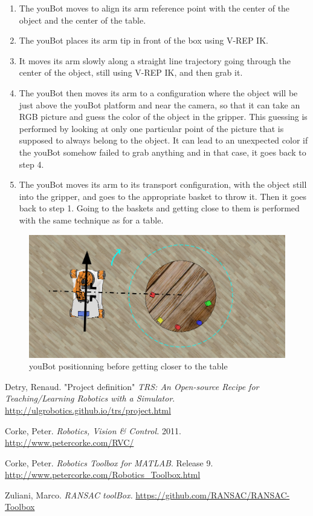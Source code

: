 \documentclass[12pt,a4paper]{article}
\begin{document}
\begin{enumerate}
\item The youBot moves to align its arm reference point with the center of the object and the center of the table.
\item The youBot places its arm tip in front of the box using V-REP IK.
\item It moves its arm slowly along a straight line trajectory going through the center of the object, still using V-REP IK, and then grab it.
\item The youBot then moves its arm to a configuration where the object will be just above the youBot platform and near the camera, so that it can take an RGB picture and guess the color of the object in the gripper. This guessing is performed by looking at only one particular point of the picture that is supposed to always belong to the object. It can lead to an unexpected color if the youBot somehow failed to grab anything and in that case, it goes back to step 4.   
\item The youBot moves its arm to its transport configuration, with the object still into the gripper, and goes to the appropriate basket to throw it. Then it goes back to step 1. Going to the baskets and getting close to them is performed with the same technique as for a table.

\end{enumerate}

\begin{figure}[h]
	\centering
		\includegraphics[width=1.00\textwidth]{tangent.png}
	\caption{youBot positionning before getting closer to the table}
	\label{tangent}
\end{figure}

\clearpage
\begin{thebibliography}{9}

Detry, Renaud. "Project definition" \textit{TRS: An Open-source Recipe for Teaching/Learning Robotics with a Simulator}. \\
\url{http://ulgrobotics.github.io/trs/project.html}

Corke, Peter. \textit{Robotics, Vision \& Control.} 2011.\\
\url{http://www.petercorke.com/RVC/}

Corke, Peter. \textit{Robotics Toolbox for MATLAB}. Release 9. \\
\url{http://www.petercorke.com/Robotics_Toolbox.html}

Zuliani, Marco. \textit{RANSAC toolBox.}
\url{https://github.com/RANSAC/RANSAC-Toolbox}


\end{thebibliography}
\end{document}

